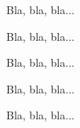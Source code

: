 Bla, bla, bla...

\docexa{} %

Bla, bla, bla...


Bla, bla, bla...

\docexa*{} %

Bla, bla, bla...

	
Bla, bla, bla...
